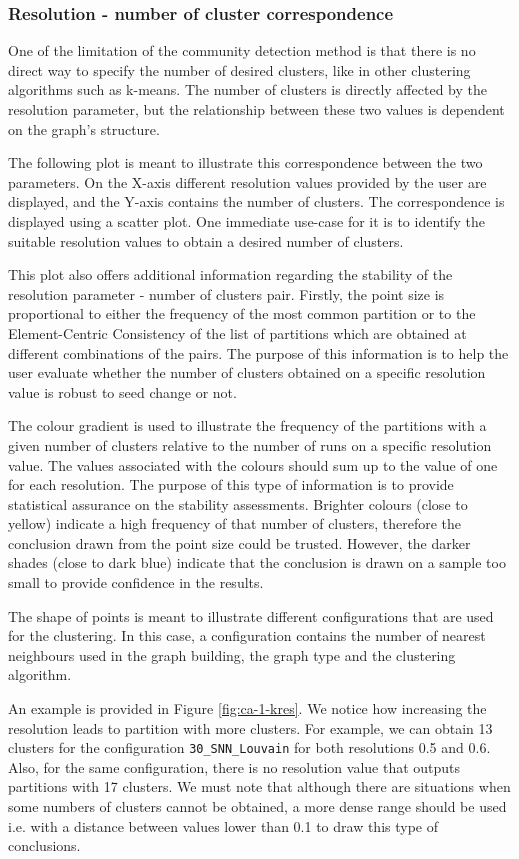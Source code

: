 \subsubsection{Resolution - number of cluster correspondence}
One of the limitation of the community detection method is that there is no direct way to specify the number of desired clusters, like in other clustering algorithms such as k-means. The number of clusters is directly affected by the resolution parameter, but the relationship between these two values is dependent on the graph's structure.

The following plot is meant to illustrate this correspondence between the two parameters. On the X-axis different resolution values provided by the user are displayed, and the Y-axis contains the number of clusters. The correspondence is displayed using a scatter plot. One immediate use-case for it is to identify the suitable resolution values to obtain a desired number of clusters. 

This plot also offers additional information regarding the stability of the resolution parameter - number of clusters pair. Firstly, the point size is proportional to either the frequency of the most common partition or to the Element-Centric Consistency of the list of partitions which are obtained at different combinations of the pairs. The purpose of this information is to help the user evaluate whether the number of clusters obtained on a specific resolution value is robust to seed change or not.

The colour gradient is used to illustrate the frequency of the partitions with a given number of clusters relative to the number of runs on a specific resolution value. The values associated with the colours should sum up to the value of one for each resolution. The purpose of this type of information is to provide statistical assurance on the stability assessments. Brighter colours (close to yellow) indicate a high frequency of that number of clusters, therefore the conclusion drawn from the point size could be trusted. However, the darker shades (close to dark blue) indicate that the conclusion is drawn on a sample too small to provide confidence in the results.

The shape of points is meant to illustrate different configurations that are used for the clustering. In this case, a configuration contains the number of nearest neighbours used in the graph building, the graph type and the clustering algorithm.

An example is provided in Figure \ref{fig:ca-1-kres}. We notice how increasing the resolution leads to partition with more clusters. For example, we can obtain 13 clusters for the configuration \verb|30_SNN_Louvain| for both resolutions 0.5 and 0.6. Also, for the same configuration, there is no resolution value that outputs partitions with 17 clusters. We must note that although there are situations when some numbers of clusters cannot be obtained, a more dense range should be used i.e. with a distance between values lower than 0.1 to draw this type of conclusions.

